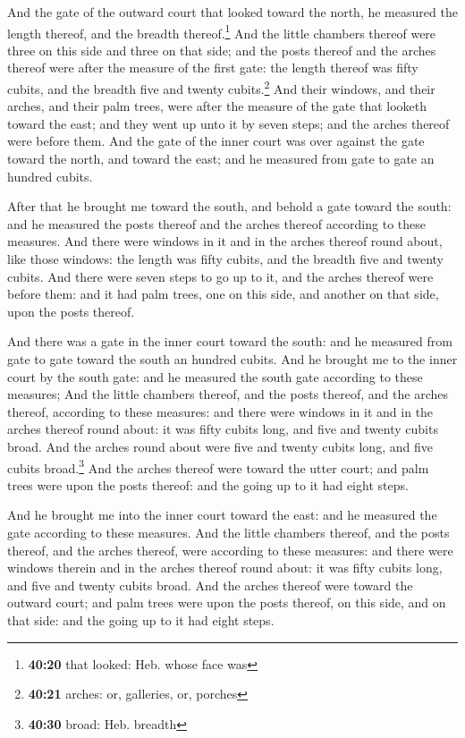  And the gate of the outward court that looked toward the
north, he measured the length thereof, and the breadth
thereof.\footnote{\textbf{40:20} that looked: Heb. whose face was}
 And the little chambers thereof were three on this side
and three on that side; and the posts thereof and the arches thereof
were after the measure of the first gate: the length thereof was fifty
cubits, and the breadth five and twenty cubits.\footnote{\textbf{40:21}
  arches: or, galleries, or, porches}  And their windows,
and their arches, and their palm trees, were after the measure of the
gate that looketh toward the east; and they went up unto it by seven
steps; and the arches thereof were before them.  And the
gate of the inner court was over against the gate toward the north, and
toward the east; and he measured from gate to gate an hundred cubits.

 After that he brought me toward the south, and behold a
gate toward the south: and he measured the posts thereof and the arches
thereof according to these measures.  And there were
windows in it and in the arches thereof round about, like those windows:
the length was fifty cubits, and the breadth five and twenty cubits.
 And there were seven steps to go up to it, and the
arches thereof were before them: and it had palm trees, one on this
side, and another on that side, upon the posts thereof.

 And there was a gate in the inner court toward the
south: and he measured from gate to gate toward the south an hundred
cubits.  And he brought me to the inner court by the
south gate: and he measured the south gate according to these measures;
 And the little chambers thereof, and the posts thereof,
and the arches thereof, according to these measures: and there were
windows in it and in the arches thereof round about: it was fifty cubits
long, and five and twenty cubits broad.  And the arches
round about were five and twenty cubits long, and five cubits
broad.\footnote{\textbf{40:30} broad: Heb. breadth}  And
the arches thereof were toward the utter court; and palm trees were upon
the posts thereof: and the going up to it had eight steps.

 And he brought me into the inner court toward the east:
and he measured the gate according to these measures. 
And the little chambers thereof, and the posts thereof, and the arches
thereof, were according to these measures: and there were windows
therein and in the arches thereof round about: it was fifty cubits long,
and five and twenty cubits broad.  And the arches thereof
were toward the outward court; and palm trees were upon the posts
thereof, on this side, and on that side: and the going up to it had
eight steps.

